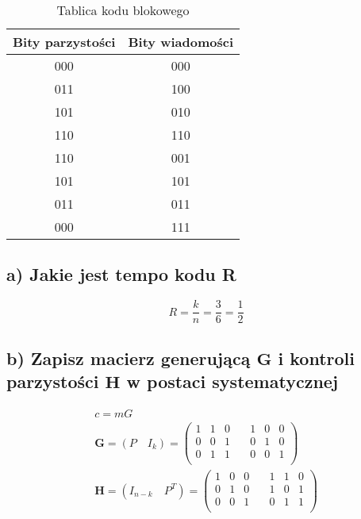 \documentclass[12pt]{article}
\begin{document}
        \begin{table}[h]
            \centering
            \begin{tabular}{c|c}
                \hline
                Bity parzystości & Bity wiadomości       \\  \hline
                000 & 000  \\ 
                011 & 100  \\
                101 & 010  \\
                110 & 110  \\
                110 & 001  \\
                101 & 101  \\
                011 & 011  \\
                000 & 111  \\ \hline
            \end{tabular}
            \caption{Tablica kodu blokowego} 
        \end{table}

    \subsection*{a) Jakie jest tempo kodu R}
    \begin{equation*}
        R = \frac{k}{n} = \frac{3}{6} = \frac{1}{2}
    \end{equation*}

    \subsection*{b) Zapisz macierz generującą $\mathbf{G}$ i kontroli parzystości $\mathbf{H}$ w postaci systematycznej}
    \begin{align*}
        c = mG \\
        \mathbf{G} = (P \quad I_k) = \begin{pmatrix}
            1 & 1 & 0 \quad & 1 & 0 & 0 \\ 
            0 & 0 & 1 \quad & 0 & 1 & 0 \\ 
            0 & 1 & 1 \quad & 0 & 0 & 1 \\ 
        \end{pmatrix} \\ 
        \mathbf{H} = (I_{n-k} \quad P^T) = \begin{pmatrix}
            1 & 0 & 0 \quad & 1 & 1 & 0 \\ 
            0 & 1 & 0 \quad & 1 & 0 & 1 \\ 
            0 & 0 & 1 \quad & 0 & 1 & 1 \\ 
        \end{pmatrix}
    \end{align*}
\end{document}
